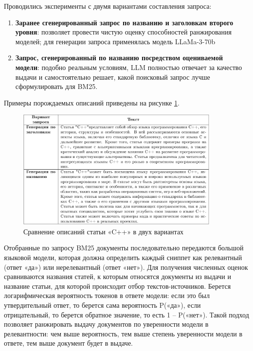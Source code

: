 \documentclass{article}
\begin{document}
Проводились эксперименты с двумя вариантами составления запроса:
\begin{enumerate}

    \item \textbf{Заранее сгенерированный запрос по названию и заголовкам второго уровня}: позволяет провести чистую оценку способностей ранжирования моделей; для генерации запроса применялась модель LLaMa-3-70b  
    
    \item \textbf{Запрос, сгенерированный по названию посредством оцениваемой модели}: подобно реальным условиям, LLM полностью отвечает за качество выдачи и самостоятельно решает, какой поисковый запрос лучше сформулировать для BM25.

\end{enumerate}
Примеры порождаемых описаний приведены на рисунке \ref{fig:c++}.

\begin{figure}[ht!]
  \centering
  \includegraphics[width=0.9\textwidth]{figures/two_queries.png}
  \caption{Сравнение описаний статьи «C++» в двух вариантах}
  \label{fig:c++}
\end{figure}

Отобранные по запросу BM25 документы последовательно передаются большой языковой модели, которая должна определить каждый сниппет как релевантный (ответ «да») или нерелевантный (ответ «нет»). 
Для получения численных оценок сравниваются названия статей, к которым относятся документы из выдачи и название статьи, для которой происходит отбор текстов-источников. 
Берется логарифмическая вероятность токенов в ответе модели: если это был утвердительный ответ, то берется сама вероятность P(«да»), если отрицательный, то берется обратное значение, то есть 1 – P(«нет»).
Такой подход позволяет ранжировать выдачу документов по уверенности модели в релевантности: чем выше вероятность, тем выше степень уверенности модели в ответе, тем выше документ будет в выдаче.
\end{document}
